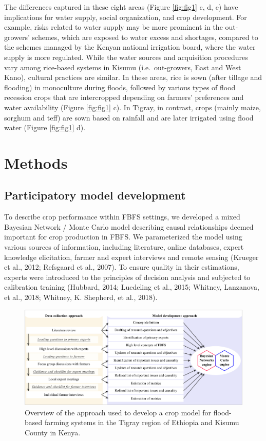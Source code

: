 \documentclass[]{elsarticle} %
\begin{document}
The differences captured in these eight areas (Figure \ref{fig:fig1} c, d, e) have implications for water supply, social organization, and crop development. For example, risks related to water supply may be more prominent in the out-growers' schemes, which are exposed to water excess and shortages, compared to the schemes managed by the Kenyan national irrigation board, where the water supply is more regulated. While the water sources and acquisition procedures vary among rice-based systems in Kisumu (i.e.~out-growers, East and West Kano), cultural practices are similar. In these areas, rice is sown (after tillage and flooding) in monoculture during floods, followed by various types of flood recession crops that are intercropped depending on farmers' preferences and water availability (Figure \ref{fig:fig1} c). In Tigray, in contrast, crops (mainly maize, sorghum and teff) are sown based on rainfall and are later irrigated using flood water (Figure \ref{fig:fig1} d).

\hypertarget{ref3}{%
\section{Methods}\label{ref3}}

\hypertarget{ref31}{%
\subsection{Participatory model development}\label{ref31}}

To describe crop performance within FBFS settings, we developed a mixed Bayesian Network / Monte Carlo model describing causal relationships deemed important for crop production in FBFS. We parameterized the model using various sources of information, including literature, online databases, expert knowledge elicitation, farmer and expert interviews and remote sensing (Krueger et al., 2012; Refsgaard et al., 2007). To ensure quality in their estimations, experts were introduced to the principles of decision analysis and subjected to calibration training (Hubbard, 2014; Luedeling et al., 2015; Whitney, Lanzanova, et al., 2018; Whitney, K. Shepherd, et al., 2018).

\begin{figure}[!h]

{\centering \includegraphics[width=1\linewidth,]{figures/approach-overview-1} 

}

\caption{Overview of the approach used to develop a crop model for flood-based farming systems in the Tigray region of Ethiopia and Kisumu County in Kenya.}\label{fig:fig2}
\end{figure}
\end{document}
